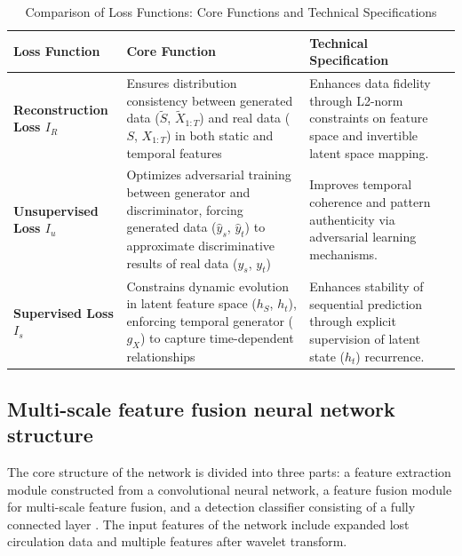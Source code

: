 \documentclass[journal,article,submit,pdftex,moreauthors]{Definitions/mdpi}
\begin{document}
\begin{table}[H]
    \centering
    \caption{Comparison of Loss Functions: Core Functions and Technical Specifications}
    \label{tab:loss_comparison}
    \begin{tabularx}{\textwidth}{>{\raggedright\arraybackslash}p{2.5cm}>{\raggedright\arraybackslash}X>{\raggedright\arraybackslash}X}
    \toprule
    \textbf{Loss Function} & \textbf{Core Function} & \textbf{Technical Specification} \\
    \midrule
    \textbf{Reconstruction Loss \({{I}_{R}}\)} & 
    Ensures distribution consistency between generated data ($\tilde{S}$, $\tilde{X}_{1:T}$) and real data ($S$, $X_{1:T}$) in both static and temporal features &
    Enhances data fidelity through L2-norm constraints on feature space and invertible latent space mapping. \\
    \addlinespace
    
    \textbf{Unsupervised Loss \({{I}_{u}}\)} & 
    Optimizes adversarial training between generator and discriminator, forcing generated data ($\hat{y}_s$, $\hat{y}_t$) to approximate discriminative results of real data ($y_s$, $y_t$) &
    Improves temporal coherence and pattern authenticity via adversarial learning mechanisms. \\
    \addlinespace
    
    \textbf{Supervised Loss \({{I}_{s}}\)} & 
    Constrains dynamic evolution in latent feature space ($h_S$, $h_t$), enforcing temporal generator ($g_X$) to capture time-dependent relationships &
    Enhances stability of sequential prediction through explicit supervision of latent state ($h_t$) recurrence. \\
    \bottomrule
    \end{tabularx}
    \end{table}









\subsection{Multi-scale feature fusion neural network structure }

The core structure of the network is divided into three parts: a feature extraction module constructed from a convolutional neural network, a feature fusion module for multi-scale feature fusion, and a detection classifier consisting of a fully connected layer \cite{zhaohongyu2023}. The input features of the network include expanded lost circulation data and multiple features after wavelet transform.
\end{document}
